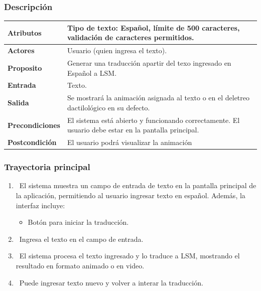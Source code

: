 \subsubsection{Descripción}

\noindent
\begin{tabularx}{\textwidth}{|l|X|}
\hline
\textbf{Atributos} & Tipo de texto: Español, límite de 500 caracteres, validación de caracteres permitidos. \\ \hline
\textbf{Actores} & Usuario (quien ingresa el texto). \\ \hline
\textbf{Proposito} & Generar una traducción apartir del texo ingresado en Español a LSM. \\ \hline
\textbf{Entrada} & Texto. \\ \hline
\textbf{Salida} & Se mostrará la animación asignada al texto o en el deletreo dactilológico en su defecto. \\ \hline
\textbf{Precondiciones} & El sistema está abierto y funcionando correctamente. El usuario debe estar en la pantalla principal. \\ \hline
\textbf{Postcondición} & El usuario podrá visualizar la animación \\ \hline
\end{tabularx}

    

\subsubsection{Trayectoria principal}
\begin{enumerate}[label=\textbf{\arabic*}, leftmargin=1.5cm]
    \item \UCsystem \ El sistema muestra un campo de entrada de texto en la pantalla principal de la aplicación, permitiendo al usuario ingresar texto en español.  
    Además, la interfaz incluye:  
    \begin{itemize}
        \item Botón para iniciar la traducción.
    \end{itemize}

    \item \UCactor \ Ingresa el texto en el campo de entrada.  
   
    \item \UCsystem \ El sistema procesa el texto ingresado y lo traduce a LSM, mostrando el resultado en formato animado o en video.

    \item \UCactor \ Puede ingresar texto nuevo y volver a interar la traducción.

\end{enumerate}

